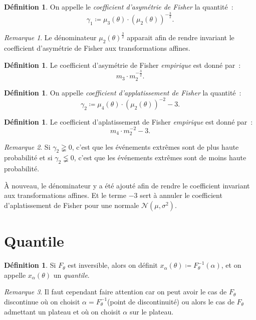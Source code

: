 \documentclass{report}
\newcommand{\Nms}{\mathcal N(\mu, \sigma^2)}
\theoremstyle{definition}
\newtheorem{déf}[thm]{Définition}
\theoremstyle{remark}
\newtheorem*{rmq}{Remarque}
\begin{document}
			\begin{déf} On appelle le \textit{coefficient d'asymétrie de Fisher} la quantité~:
			\[\gamma_1 \coloneqq \mu_3(\theta) \cdot \left(\mu_2(\theta)\right)^{-\frac 32}.\]
			\end{déf}

			\begin{rmq} Le dénominateur $\mu_2(\theta)^{\frac 32}$ apparait afin de rendre invariant le coefficient d'asymétrie de Fisher aux transformations
			affines. \end{rmq}

			\begin{déf} Le coefficient d'asymétrie de Fisher \textit{empirique} est donné par~:
			\[m_3 \cdot m_2^{-\frac 32}.\]
			\end{déf}

			\begin{déf} On appelle \textit{coefficient d'applatissement de Fisher} la quantité~:
			\[\gamma_2 \coloneqq \mu_4(\theta) \cdot \left(\mu_2(\theta)\right)^{-2} - 3.\]
			\end{déf}

			\begin{déf} Le coefficient d'aplatissement de Fisher \textit{empirique} est donné par~:
			\[m_4 \cdot m_2^{-2} - 3.\]
			\end{déf}

			\begin{rmq} Si $\gamma_2 \gneqq 0$, c'est que les événements extrêmes sont de plus haute probabilité et si $\gamma_2 \lneqq 0$, c'est que les
			événements extrêmes sont de moins haute probabilité.

			À nouveau, le dénominateur y a été ajouté afin de rendre le coefficient invariant aux transformations affines. Et le terme $-3$ sert à annuler le
			coefficient d'aplatissement de Fisher pour une normale $\Nms$. \end{rmq}

	\section{Quantile}
		\begin{déf} Si $F_\theta$ est inversible, alors on définit $x_\alpha(\theta) \coloneqq F_\theta^{-1}(\alpha)$, et on appelle $x_\alpha(\theta)$ un
		\textit{quantile}. \end{déf}

		\begin{rmq} Il faut cependant faire attention car on peut avoir le cas de $F_\theta$ discontinue où on choisit $\alpha = F_\theta^{-1}$(point de
		discontinuité) ou alors le cas de $F_\theta$ admettant un plateau et où on choisit $\alpha$ sur le plateau. \end{rmq}
\end{document}
